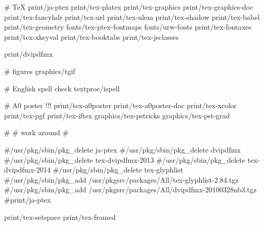 # TeX
print/ja-ptex
print/tex-platex
print/tex-graphics
print/tex-graphics-doc
print/tex-fancyhdr
print/tex-url
print/tex-ulem
print/tex-shadow
print/tex-babel
print/tex-geometry
fonts/tex-ptex-fontmaps
fonts/urw-fonts
print/tex-fontaxes
print/tex-xkeyval
print/tex-booktabs
print/tex-jsclasses

print/dvipdfmx

# figures
graphics/tgif

# English spell check
textproc/ispell

# A0 poster !!!
print/tex-a0poster
print/tex-a0poster-doc
print/tex-xcolor
print/tex-pgf
print/tex-iftex
graphics/tex-pstricks
graphics/tex-pst-grad


#
# work around
#

#/usr/pkg/sbin/pkg_delete ja-ptex
#/usr/pkg/sbin/pkg_delete dvipdfmx
#/usr/pkg/sbin/pkg_delete tex-dvipdfmx-2013
#/usr/pkg/sbin/pkg_delete tex-dvipdfmx-2014
#/usr/pkg/sbin/pkg_delete tex-glyphlist
#/usr/pkg/sbin/pkg_add /usr/pkgsrc/packages/All/tex-glyphlist-2.84.tgz
#/usr/pkg/sbin/pkg_add /usr/pkgsrc/packages/All/dvipdfmx-20100328nb3.tgz
#print/ja-ptex


print/tex-setspace
print/tex-framed
